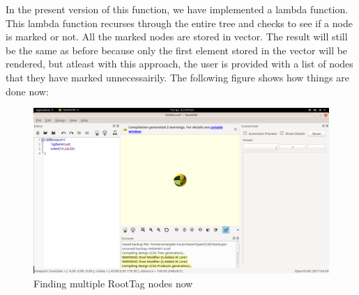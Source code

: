 In the present version of this function, we have implemented a lambda function. This lambda function recurses through the entire tree and checks to see if a node is marked or not. All the marked nodes are stored in vector. The result will still be the same as before because only the first element stored in the vector will be rendered, but atleast with this approach, the user is provided with a list of nodes that they have marked unnecessairily. The following figure shows how things are done now:\\
\begin{figure}[H]
	\centering
	\includegraphics[width=\linewidth]{images/output/now_right.png}
	\caption{Finding multiple RootTag nodes now}
\end{figure}

